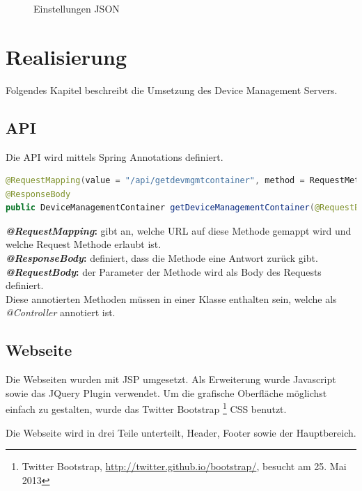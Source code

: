 \begin{figure}[H]
	\centering
	
	\caption{Einstellungen JSON}
\end{figure}



\section{Realisierung}
Folgendes Kapitel beschreibt die Umsetzung des Device Management Servers.

\subsection{API}
Die API wird mittels Spring Annotations definiert. 

\begin{lstlisting}[language=Java, caption=Spring Annotation]
@RequestMapping(value = "/api/getdevmgmtcontainer", method = RequestMethod.POST)
@ResponseBody
public DeviceManagementContainer getDeviceManagementContainer(@RequestBody final StatusData request)

\end{lstlisting}
\textbf{\textit{@RequestMapping}:} gibt an, welche URL auf diese Methode gemappt wird und welche Request Methode erlaubt ist.\\
\textbf{\textit{@ResponseBody}: } definiert, dass die Methode eine Antwort zurück gibt.\\
\textbf{\textit{@RequestBody}: } der Parameter der Methode wird als Body des Requests definiert.\\
Diese annotierten Methoden müssen in einer Klasse enthalten sein, welche als \textit{@Controller} annotiert ist.


\subsection{Webseite}
Die Webseiten wurden mit JSP umgesetzt. Als Erweiterung wurde Javascript sowie das JQuery Plugin verwendet. Um die grafische Oberfläche möglichst einfach zu gestalten, wurde das Twitter Bootstrap \footnote{Twitter Bootstrap, \url{http://twitter.github.io/bootstrap/}, besucht am 25. Mai 2013} CSS benutzt.

Die Webseite wird in drei Teile unterteilt, Header, Footer sowie der Hauptbereich. 

